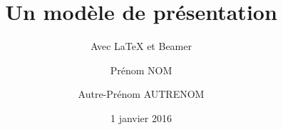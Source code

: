 \title{Un modèle de présentation}
\subtitle{Avec \LaTeX{} et Beamer}
\author{Prénom NOM \and Autre-Prénom AUTRENOM}
\date{1\ier{} janvier 2016}
